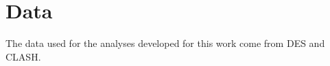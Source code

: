{\section{Data}\label{observations}
The data used for the analyses developed for this work come from DES and CLASH. %


}
